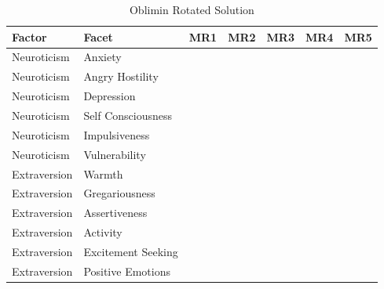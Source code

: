 \documentclass{article}\usepackage[]{graphicx}\usepackage[]{color}
\begin{document}
\begin{table}
\caption{\label{tab:unnamed-chunk-16}Oblimin Rotated Solution}
\centering
\begin{tabular}[t]{lllllll}
\toprule
Factor & Facet & MR1 & MR2 & MR3 & MR4 & MR5\\
\midrule
Neuroticism & Anxiety & \cellcolor{white}{-0.08} & \cellcolor{white}{0.06} & \cellcolor{yellow}{0.84} & \cellcolor{white}{-0.02} & \cellcolor{white}{0.02}\\
Neuroticism & Angry Hostility & \cellcolor{white}{-0.16} & \cellcolor{white}{-0.09} & \cellcolor{white}{0.47} & \cellcolor{yellow}{-0.71} & \cellcolor{white}{-0.13}\\
Neuroticism & Depression & \cellcolor{white}{-0.15} & \cellcolor{white}{-0.25} & \cellcolor{yellow}{0.85} & \cellcolor{white}{-0.08} & \cellcolor{white}{0}\\
Neuroticism & Self Consciousness & \cellcolor{white}{-0.24} & \cellcolor{white}{0.01} & \cellcolor{yellow}{0.74} & \cellcolor{white}{0.1} & \cellcolor{white}{-0.09}\\
Neuroticism & Impulsiveness & \cellcolor{white}{0.22} & \cellcolor{white}{-0.27} & \cellcolor{white}{0.37} & \cellcolor{white}{-0.26} & \cellcolor{white}{0.06}\\
\addlinespace
Neuroticism & Vulnerability & \cellcolor{white}{-0.2} & \cellcolor{white}{-0.23} & \cellcolor{yellow}{0.8} & \cellcolor{white}{-0.03} & \cellcolor{white}{-0.13}\\
Extraversion & Warmth & \cellcolor{yellow}{0.84} & \cellcolor{white}{0.16} & \cellcolor{white}{-0.15} & \cellcolor{white}{0.17} & \cellcolor{white}{0.17}\\
Extraversion & Gregariousness & \cellcolor{yellow}{0.68} & \cellcolor{white}{0.06} & \cellcolor{white}{-0.22} & \cellcolor{white}{-0.1} & \cellcolor{white}{0.1}\\
Extraversion & Assertiveness & \cellcolor{white}{0.48} & \cellcolor{white}{0.31} & \cellcolor{white}{-0.41} & \cellcolor{white}{-0.31} & \cellcolor{white}{0.04}\\
Extraversion & Activity & \cellcolor{white}{0.5} & \cellcolor{white}{0.4} & \cellcolor{white}{-0.2} & \cellcolor{white}{-0.3} & \cellcolor{white}{0.18}\\
\addlinespace
Extraversion & Excitement Seeking & \cellcolor{white}{0.36} & \cellcolor{white}{-0.12} & \cellcolor{white}{-0.21} & \cellcolor{white}{-0.19} & \cellcolor{white}{0.26}\\
Extraversion & Positive Emotions & \cellcolor{yellow}{0.72} & \cellcolor{white}{0.18} & \cellcolor{white}{-0.36} & \cellcolor{white}{0.12} & \cellcolor{white}{0.41}\\

\end{tabular}
\end{table}
\end{document}
